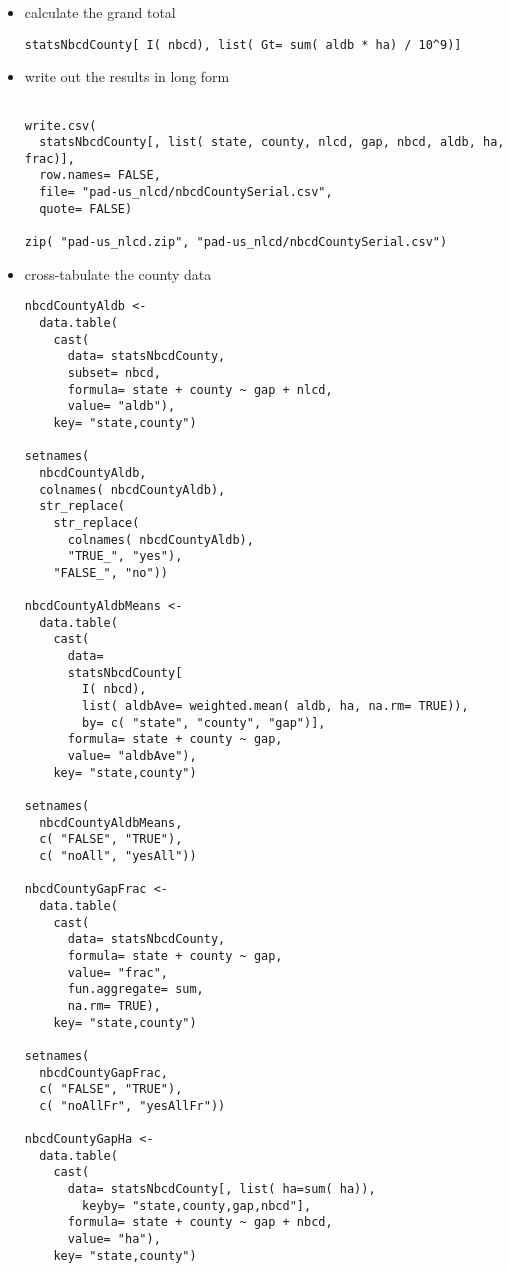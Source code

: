 \documentclass[11pt]{article}
\begin{document}
\begin{itemize}
\item calculate the grand total\\
\label{sec-3-5-5-3}%
\begin{verbatim}
statsNbcdCounty[ I( nbcd), list( Gt= sum( aldb * ha) / 10^9)]
\end{verbatim}



\item write out the results in long form\\
\label{sec-3-5-5-4}%
\begin{verbatim}

write.csv(
  statsNbcdCounty[, list( state, county, nlcd, gap, nbcd, aldb, ha, frac)],
  row.names= FALSE,
  file= "pad-us_nlcd/nbcdCountySerial.csv",
  quote= FALSE)

zip( "pad-us_nlcd.zip", "pad-us_nlcd/nbcdCountySerial.csv")
\end{verbatim}


\item cross-tabulate the county data\\
\label{sec-3-5-5-5}%
\begin{verbatim}
nbcdCountyAldb <- 
  data.table(
    cast(
      data= statsNbcdCounty,
      subset= nbcd,
      formula= state + county ~ gap + nlcd,
      value= "aldb"),
    key= "state,county")

setnames(
  nbcdCountyAldb,
  colnames( nbcdCountyAldb),
  str_replace(
    str_replace(
      colnames( nbcdCountyAldb),
      "TRUE_", "yes"),
    "FALSE_", "no"))

nbcdCountyAldbMeans <- 
  data.table(
    cast(
      data=
      statsNbcdCounty[
        I( nbcd),
        list( aldbAve= weighted.mean( aldb, ha, na.rm= TRUE)),
        by= c( "state", "county", "gap")],
      formula= state + county ~ gap,
      value= "aldbAve"),
    key= "state,county")

setnames(
  nbcdCountyAldbMeans,
  c( "FALSE", "TRUE"),
  c( "noAll", "yesAll"))

nbcdCountyGapFrac <-
  data.table(
    cast(
      data= statsNbcdCounty,
      formula= state + county ~ gap,
      value= "frac",
      fun.aggregate= sum,
      na.rm= TRUE),
    key= "state,county")

setnames(
  nbcdCountyGapFrac,
  c( "FALSE", "TRUE"),
  c( "noAllFr", "yesAllFr"))

nbcdCountyGapHa <-
  data.table(
    cast(
      data= statsNbcdCounty[, list( ha=sum( ha)),
        keyby= "state,county,gap,nbcd"],
      formula= state + county ~ gap + nbcd,
      value= "ha"),
    key= "state,county")


\end{verbatim}
\end{itemize}
\end{document}
